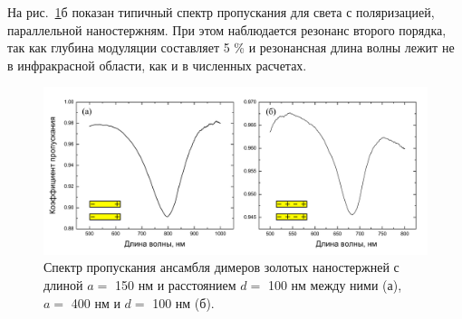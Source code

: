 На рис.~\ref{img:spectra}б показан типичный спектр пропускания для света с поляризацией, параллельной наностержням. При этом наблюдается резонанс второго порядка, так как глубина модуляции составляет 5 \% и резонансная длина волны лежит не в инфракрасной области, как и в численных расчетах.

\begin{figure}
\centering
\includegraphics[width=1\linewidth]{img/microspectroscopy/spectra_1-2res.pdf}
\caption{Спектр пропускания ансамбля димеров золотых наностержней с длиной $ a = $ 150 нм и расстоянием $ d = $  100 нм между ними (а), $ a = $ 400 нм и $ d = $ 100 нм (б).}
\label{img:spectra}
\end{figure}

